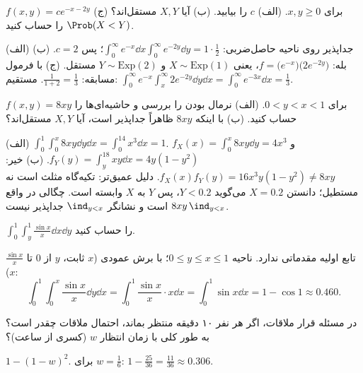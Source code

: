 \begin{exercise}
$f(x,y)=ce^{-x-2y}$ برای $x,y\ge0$. (الف) $c$ را بیابید. (ب) آیا $X,Y$ مستقل‌اند؟ (ج) $\Prob(X<Y)$ را حساب کنید.
\end{exercise}
\begin{solution}
(الف) جداپذیر روی ناحیه حاصل‌ضربی: $\int_0^\infty e^{-x}\dd x\int_0^\infty e^{-2y}\dd y=1\cdot\frac12$؛ پس $c=2$.
(ب) بله: $f=\big(e^{-x}\big)\big(2e^{-2y}\big)$، یعنی $X\sim\mathrm{Exp}(1)$ و $Y\sim\mathrm{Exp}(2)$ مستقل.
(ج) با فرمول مسابقه: $\frac{1}{1+2}=\frac13$. مستقیم: $\int_0^\infty e^{-x}\int_x^\infty2e^{-2y}\dd y\dd x=\int_0^\infty e^{-3x}\dd x=\frac13$.
\end{solution}

\begin{exercise}
$f(x,y)=8xy$ برای $0<y<x<1$. (الف) نرمال بودن را بررسی و حاشیه‌ای‌ها را حساب کنید. (ب) با اینکه $8xy$ ظاهراً جداپذیر است، آیا $X,Y$ مستقل‌اند؟
\end{exercise}
\begin{solution}
(الف) $\int_0^1\int_0^x8xy\dd y\dd x=\int_0^14x^3\dd x=1$. $f_X(x)=\int_0^x8xy\dd y=4x^3$ و $f_Y(y)=\int_y^18xy\dd x=4y(1-y^2)$.
(ب) خیر: $f_X(x)f_Y(y)=16x^3y(1-y^2)\neq8xy$. دلیل عمیق‌تر: تکیه‌گاه مثلث است نه مستطیل؛ دانستن $X=0.2$ می‌گوید $Y<0.2$، پس $Y$ به $X$ وابسته است. چگالی در واقع $8xy\,\ind_{y<x}$ است و نشانگر $\ind_{y<x}$ جداپذیر نیست.
\end{solution}

\begin{exercise}
$\int_0^1\int_y^1\frac{\sin x}{x}\dd x\dd y$ را حساب کنید.
\end{exercise}
\begin{solution}
$\frac{\sin x}{x}$ تابع اولیه مقدماتی ندارد. ناحیه $0\le y\le x\le1$؛ با برش عمودی ($x$ ثابت، $y$ از $0$ تا $x$):
\[
\int_0^1\!\!\int_0^x\frac{\sin x}{x}\dd y\dd x=\int_0^1\frac{\sin x}{x}\cdot x\dd x=\int_0^1\sin x\dd x=1-\cos1\approx0.460 .
\]
\end{solution}

\begin{exercise}
در مسئله قرار ملاقات، اگر هر نفر ۱۰ دقیقه منتظر بماند، احتمال ملاقات چقدر است؟ به طور کلی با زمان انتظار $w$ (کسری از ساعت)؟
\end{exercise}
\begin{solution}
$1-(1-w)^2$. برای $w=\frac16$: $1-\frac{25}{36}=\frac{11}{36}\approx0.306$.
\end{solution}

